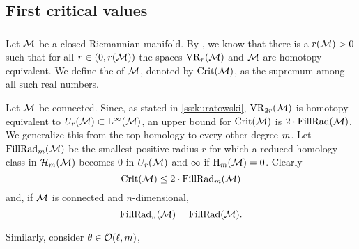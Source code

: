 
\subsection{First critical values}\label{sub:general_barcodes}



\subsubsection{}\label{subsub:first_critical_value}\label{subsub:beta v.s. fillrad}

Let \(\mathcal{M}\) be a closed Riemannian manifold.
By \cite[Thm.3.5]{hausmann1995vietoris}, we know that there is a \(r(\mathcal{M}) > 0\) such that for all \(r \in (0,r(\mathcal{M}))\) the spaces \(\operatorname{VR}_r(\mathcal{M})\) and \(\mathcal{M}\) are homotopy equivalent.
We define the  of \(\mathcal{M}\), denoted by \(\operatorname{Crit}(\mathcal{M})\), as the supremum among all such real numbers.

Let \(\mathcal{M}\) be connected.
Since, as stated in \cref{ss:kuratowski}, \(\operatorname{VR}_{2r}(\mathcal{M})\) is homotopy equivalent to \(U_r(\mathcal{M}) \subset \mathrm{L}^\infty(\mathcal{M})\), an upper bound for \(\operatorname{Crit}(\mathcal{M})\) is \(2\cdot\operatorname{FillRad}(\mathcal{M})\).
We generalize this from the top homology to every other degree \(m\).
Let \(\operatorname{FillRad}_m(\mathcal{M})\) be the smallest positive radius $r$ for which a reduced homology class in \(\mathcal{H}_m(\mathcal{M})\) becomes \(0\) in \(U_r(\mathcal{M})\) and $\infty$ if $\mathrm{H}_m(\mathcal{M}) = 0$. 
Clearly
\[
\operatorname{Crit}(\mathcal{M}) \leq 2 \cdot \operatorname{FillRad}_m(\mathcal{M})
\]
and, if \(\mathcal{M}\) is connected and \(n\)-dimensional,
\[
\operatorname{FillRad}_n(\mathcal{M}) = \operatorname{FillRad}(\mathcal{M}).
\]

Similarly, consider \(\theta \in \mathcal{O}(\ell, m)\), 

